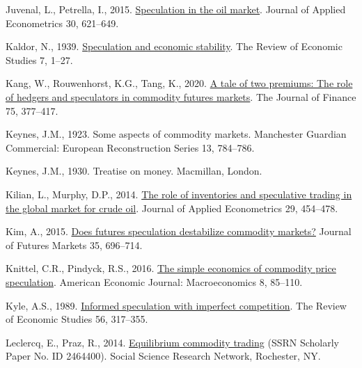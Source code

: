 \documentclass[]{elsarticle} %
\newlength{\cslhangindent}
\newlength{\cslentryspacingunit} %
\newenvironment{CSLReferences}[2] %
 {%
  \setlength{\parindent}{0pt}
  \ifodd #1
  \let\oldpar\par
  \def\par{\hangindent=\cslhangindent\oldpar}
  \fi
  \setlength{\parskip}{#2\cslentryspacingunit}
 }%
 {}
\begin{document}
\begin{CSLReferences}{1}{0}
\leavevmode{}%
Juvenal, L., Petrella, I., 2015. \href{https://doi.org/10.1002/jae.2388}{Speculation in the oil market}. Journal of Applied Econometrics 30, 621--649.

\leavevmode{}%
Kaldor, N., 1939. \href{https://doi.org/10.2307/2967593}{{Speculation and economic stability}}. The Review of Economic Studies 7, 1--27.

\leavevmode{}%
Kang, W., Rouwenhorst, K.G., Tang, K., 2020. \href{https://doi.org/10.1111/jofi.12845}{A tale of two premiums: The role of hedgers and speculators in commodity futures markets}. The Journal of Finance 75, 377--417.

\leavevmode{}%
Keynes, J.M., 1923. Some aspects of commodity markets. Manchester Guardian Commercial: European Reconstruction Series 13, 784--786.

\leavevmode{}%
Keynes, J.M., 1930. Treatise on money. Macmillan, London.

\leavevmode{}%
Kilian, L., Murphy, D.P., 2014. \href{https://doi.org/10.1002/jae.2322}{The role of inventories and speculative trading in the global market for crude oil}. Journal of Applied Econometrics 29, 454--478.

\leavevmode{}%
Kim, A., 2015. \href{https://doi.org/10.1002/fut.21716}{Does futures speculation destabilize commodity markets?} Journal of Futures Markets 35, 696--714.

\leavevmode{}%
Knittel, C.R., Pindyck, R.S., 2016. \href{https://doi.org/10.1257/mac.20140033}{The simple economics of commodity price speculation}. American Economic Journal: Macroeconomics 8, 85--110.

\leavevmode{}%
Kyle, A.S., 1989. \href{https://doi.org/10.2307/2297551}{Informed speculation with imperfect competition}. The Review of Economic Studies 56, 317--355.

\leavevmode{}%
Leclercq, E., Praz, R., 2014. \href{https://doi.org/10.2139/ssrn.2464400}{Equilibrium commodity trading} (SSRN Scholarly Paper No. ID 2464400). Social Science Research Network, Rochester, NY.


\end{CSLReferences}
\end{document}
